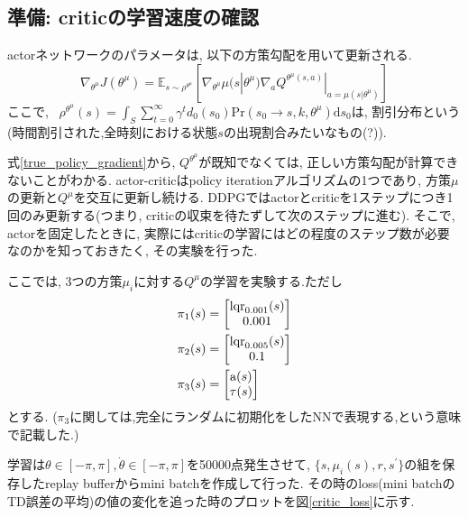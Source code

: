 \documentclass{jsarticle}
\newcommand{\expect}{\mathbb{E}}
\begin{document}
{\subsection{準備: criticの学習速度の確認}
actorネットワークのパラメータは, 以下の方策勾配を用いて更新される.
\begin{equation}
	\nabla_{\theta^{\mu}}J(\theta^{\mu}) = \expect_{s\sim \rho^{\theta^{\mu}}}[\nabla_{\theta^{\mu}}\mu(s|\theta^{\mu})\nabla_aQ^{\theta^{\mu}(s,a)}|_{a=\mu(s|\theta^{\mu})}] \label{true_policy_gradient}
\end{equation}
ここで, ~$ \rho^{\theta^{\mu}}(s)=\int_{S}\sum_{t=0}^{\infty}\gamma^td_0(s_0)\textrm{Pr}(s_0\to s, k,  \theta^{\mu})\textrm{d}s_0$は, 割引分布という(時間割引された,全時刻における状態$s$の出現割合みたいなもの(?)). \par
式\eqref{true_policy_gradient}から, $Q^{\theta^{\mu}}$が既知でなくては, 正しい方策勾配が計算できないことがわかる. actor-criticはpolicy iterationアルゴリズムの1つであり, 方策$\mu$の更新と$Q^{\mu}$を交互に更新し続ける. DDPGではactorとcriticを1ステップにつき1回のみ更新する(つまり, criticの収束を待たずして次のステップに進む). そこで, actorを固定したときに, 実際にはcriticの学習にはどの程度のステップ数が必要なのかを知っておきたく, その実験を行った.\par
ここでは, 3つの方策$\mu_{i}$に対する$Q^{\mu}$の学習を実験する.ただし
\begin{align}
	\pi_1(s) &= \begin{bmatrix}\textrm{lqr}_{0.001}(s) \\ 0.001 \end{bmatrix} \\
	\pi_2(s) &= \begin{bmatrix}\textrm{lqr}_{0.005}(s) \\ 0.1 \end{bmatrix} \\
	\pi_3(s) &= \begin{bmatrix}\textrm a(s) \\ \tau(s) \end{bmatrix} \\
\end{align}
とする. ($\pi_3$に関しては,完全にランダムに初期化をしたNNで表現する,という意味で記載した.) \par
学習は$\theta\in[-\pi, \pi], \dot{\theta}\in[-\pi,\pi]$を50000点発生させて, $\{s, \mu_i(s), r, s^{\prime}\}$の組を保存したreplay bufferからmini batchを作成して行った. その時のloss(mini batchのTD誤差の平均)の値の変化を追った時のプロットを図\ref{critic_loss}に示す.\\
}
\end{document}
